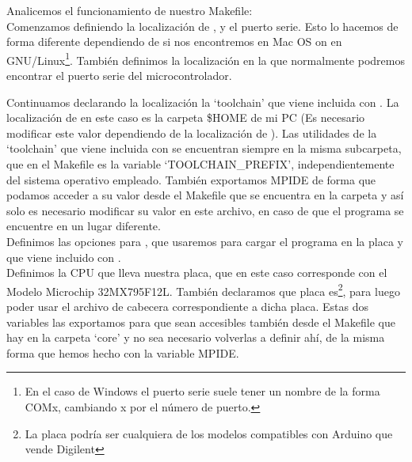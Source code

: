 

 Analicemos el funcionamiento de nuestro Makefile:\\

 Comenzamos definiendo la localización de ,  y el puerto serie. Esto lo hacemos de forma diferente dependiendo de si nos encontremos en Mac OS on en GNU/Linux\protect\footnote{En el caso de Windows el puerto serie suele tener un nombre de la forma COMx, cambiando x por el número de puerto.}. También definimos la localización en la que normalmente podremos encontrar el puerto serie del microcontrolador.
 

 Continuamos declarando la localización la `toolchain' que viene incluida con . La localización de  en este caso es la carpeta \$HOME de mi PC (Es necesario modificar este valor dependiendo de la localización de ). Las utilidades de la `toolchain' que viene incluida con  se encuentran siempre en la misma subcarpeta, que en el Makefile es la variable `TOOLCHAIN\_PREFIX', independientemente del sistema operativo empleado. También exportamos MPIDE de forma que podamos acceder a su valor desde el Makefile que se encuentra en la carpeta  y así solo es necesario modificar su valor en este archivo, en caso de que el programa se encuentre en un lugar diferente.\\
 
 
 Definimos las opciones para , que usaremos para cargar el programa en la placa y que viene incluido con .\\
 
 
 Definimos la CPU que lleva nuestra placa, que en este caso corresponde con el Modelo Microchip 32MX795F12L. También declaramos que placa es\protect\footnote{La placa podría ser cualquiera de los modelos compatibles con Arduino que vende Digilent}, para luego poder usar el archivo de cabecera correspondiente a dicha placa. Estas dos variables las exportamos para que sean accesibles también desde el Makefile que hay en la carpeta `core' y no sea necesario volverlas a definir ahí, de la misma forma que hemos hecho con la variable MPIDE.\\
 
